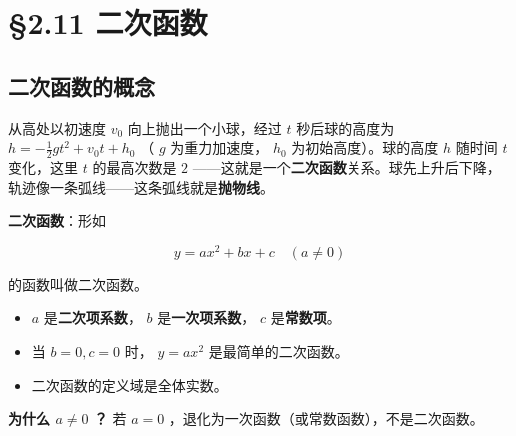\chapter{§2.11 二次函数}
\label{sec:2.11}





\section*{二次函数的概念}


\begin{explore}


从高处以初速度 $v_0$ 向上抛出一个小球，经过 $t$ 秒后球的高度为 $h = -\frac{1}{2}g t^2 + v_0 t + h_0$ （ $g$ 为重力加速度， $h_0$ 为初始高度）。球的高度 $h$ 随时间 $t$ 变化，这里 $t$ 的最高次数是 $2$ ——这就是一个\textbf{二次函数}关系。球先上升后下降，轨迹像一条弧线——这条弧线就是\textbf{抛物线}。

\end{explore}

\begin{understand}


\textbf{二次函数}：形如

\[
y = ax^2 + bx + c \quad (a \neq 0)
\]


的函数叫做二次函数。

\begin{itemize}
  \item $a$ 是\textbf{二次项系数}， $b$ 是\textbf{一次项系数}， $c$ 是\textbf{常数项}。
  \item 当 $b = 0, c = 0$ 时， $y = ax^2$ 是最简单的二次函数。
  \item 二次函数的定义域是全体实数。
\end{itemize}


\textbf{为什么 $a \neq 0$ ？} 若 $a = 0$ ，退化为一次函数（或常数函数），不是二次函数。

\end{understand}

